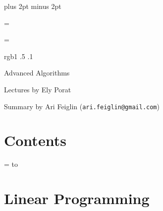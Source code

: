 

\parindent=0pt
\parskip=3pt plus 2pt minus 2pt



\footline={}


\headline={}

\color rgb{1 .5 .1}

{\def\boxshadowcolor{rgb{.8 .6 0}}

    \centerline{Advanced Algorithms}
    \smallskip
    \centerline{Lectures by Ely Porat}
    \centerline{Summary by Ari Feiglin ({\tt ari.feiglin@gmail.com})}

\eppbox

\bigskip

    \section*{Contents}
    
    \tableofcontents
\eppbox

}

\vfill\break

\color{black}

\newif\ifpageodd
\pageoddtrue
\headline={%
    \hbox to \hsize{\color{black}%
        \ifpageodd\hfil{\it\currsubsection\quad\bf\folio}\global\pageoddfalse%
        \else{\bf\folio\quad\it\currsubsection}\hfil\global\pageoddtrue\fi%
    }%
}

\section{Linear Programming}



\bye

